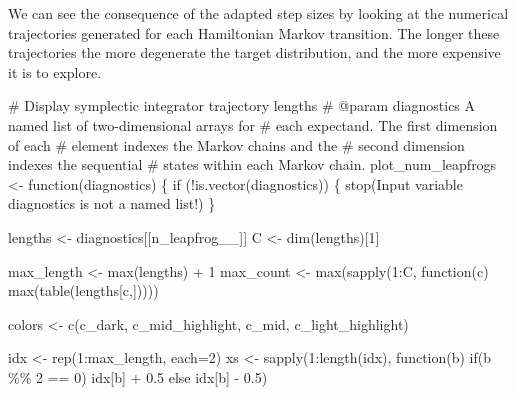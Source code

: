 \documentclass[
  letterpaper,
  DIV=11,
  numbers=noendperiod]{scrartcl}
\newenvironment{Shaded}{\begin{snugshade}}{\end{snugshade}}
\newcommand{\BuiltInTok}[1]{\textcolor[rgb]{0.00,0.23,0.31}{#1}}
\newcommand{\CommentTok}[1]{\textcolor[rgb]{0.37,0.37,0.37}{#1}}
\newcommand{\ControlFlowTok}[1]{\textcolor[rgb]{0.00,0.23,0.31}{#1}}
\newcommand{\DecValTok}[1]{\textcolor[rgb]{0.68,0.00,0.00}{#1}}
\newcommand{\FloatTok}[1]{\textcolor[rgb]{0.68,0.00,0.00}{#1}}
\newcommand{\KeywordTok}[1]{\textcolor[rgb]{0.00,0.23,0.31}{#1}}
\newcommand{\NormalTok}[1]{\textcolor[rgb]{0.00,0.23,0.31}{#1}}
\newcommand{\OperatorTok}[1]{\textcolor[rgb]{0.37,0.37,0.37}{#1}}
\newcommand{\StringTok}[1]{\textcolor[rgb]{0.13,0.47,0.30}{#1}}
\begin{document}
We can see the consequence of the adapted step sizes by looking at the
numerical trajectories generated for each Hamiltonian Markov transition.
The longer these trajectories the more degenerate the target
distribution, and the more expensive it is to explore.

\begin{Shaded}
\begin{Highlighting}[]
\CommentTok{\# Display symplectic integrator trajectory lengths}
\CommentTok{\# @param diagnostics A named list of two{-}dimensional arrays for }
\CommentTok{\#                    each expectand.  The first dimension of each}
\CommentTok{\#                    element indexes the Markov chains and the }
\CommentTok{\#                    second dimension indexes the sequential }
\CommentTok{\#                    states within each Markov chain.}
\NormalTok{plot\_num\_leapfrogs }\OperatorTok{\textless{}{-}}\NormalTok{ function(diagnostics) \{}
  \ControlFlowTok{if}\NormalTok{ (}\OperatorTok{!}\KeywordTok{is}\NormalTok{.vector(diagnostics)) \{}
\NormalTok{    stop(}\StringTok{\textquotesingle{}Input variable \textasciigrave{}diagnostics\textasciigrave{} is not a named list!\textquotesingle{}}\NormalTok{)}
\NormalTok{  \}}
  
\NormalTok{  lengths }\OperatorTok{\textless{}{-}}\NormalTok{ diagnostics[[}\StringTok{\textquotesingle{}n\_leapfrog\_\_\textquotesingle{}}\NormalTok{]]}
\NormalTok{  C }\OperatorTok{\textless{}{-}}\NormalTok{ dim(lengths)[}\DecValTok{1}\NormalTok{]}

\NormalTok{  max\_length }\OperatorTok{\textless{}{-}} \BuiltInTok{max}\NormalTok{(lengths) }\OperatorTok{+} \DecValTok{1}
\NormalTok{  max\_count }\OperatorTok{\textless{}{-}} \BuiltInTok{max}\NormalTok{(sapply(}\DecValTok{1}\NormalTok{:C, function(c) }\BuiltInTok{max}\NormalTok{(table(lengths[c,]))))}

\NormalTok{  colors }\OperatorTok{\textless{}{-}}\NormalTok{ c(c\_dark, c\_mid\_highlight, c\_mid, c\_light\_highlight)}

\NormalTok{  idx }\OperatorTok{\textless{}{-}}\NormalTok{ rep(}\DecValTok{1}\NormalTok{:max\_length, each}\OperatorTok{=}\DecValTok{2}\NormalTok{)}
\NormalTok{  xs }\OperatorTok{\textless{}{-}}\NormalTok{ sapply(}\DecValTok{1}\NormalTok{:length(idx), function(b) }\ControlFlowTok{if}\NormalTok{(b }\OperatorTok{\%\%} \DecValTok{2} \OperatorTok{==} \DecValTok{0}\NormalTok{) idx[b] }\OperatorTok{+} \FloatTok{0.5}
                                          \ControlFlowTok{else}\NormalTok{ idx[b] }\OperatorTok{{-}} \FloatTok{0.5}\NormalTok{)}


\end{Highlighting}
\end{Shaded}
\end{document}
